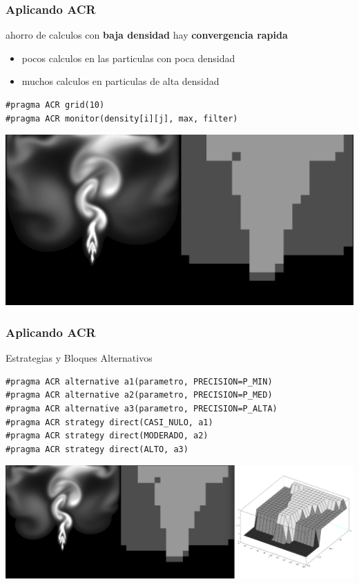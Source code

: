 \documentclass{beamer}\usetheme{Madrid} %
\begin{document}
\begin{frame}[fragile]
\frametitle{Aplicando ACR}
\begin{block}{ahorro de calculos}
con \textbf{baja densidad} hay \textbf{convergencia rapida} 
\begin{itemize}
\item pocos calculos en las particulas con poca densidad
\item muchos calculos en particulas de alta densidad
\end{itemize}
\end{block}
\begin{block}{}
\begin{verbatim}
#pragma ACR grid(10)
#pragma ACR monitor(density[i][j], max, filter)
\end{verbatim}
\end{block}
\begin{center}
\includegraphics[scale=0.22]{img/sim_and_grid.png}
\end{center}
\end{frame}
\begin{frame}[fragile]
\frametitle{Aplicando ACR}
\begin{block}{Estrategias y Bloques Alternativos}
\begin{verbatim}
#pragma ACR alternative a1(parametro, PRECISION=P_MIN)
#pragma ACR alternative a2(parametro, PRECISION=P_MED)
#pragma ACR alternative a3(parametro, PRECISION=P_ALTA)
#pragma ACR strategy direct(CASI_NULO, a1)
#pragma ACR strategy direct(MODERADO, a2)
#pragma ACR strategy direct(ALTO, a3)
\end{verbatim}
\end{block}
\begin{center}
\includegraphics[scale=0.2]{img/all_sights.png}
\end{center}
\end{frame}
\end{document}
